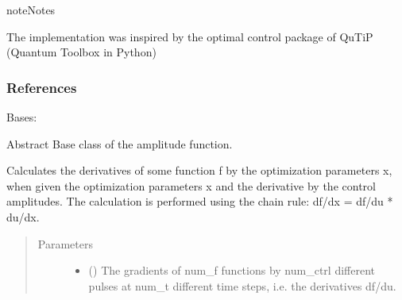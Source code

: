 \documentclass[letterpaper,10pt,english]{sphinxmanual}
\begin{document}
\begin{sphinxadmonition}{note}{Notes}

The implementation was inspired by the optimal control package of QuTiP 
(Quantum Toolbox in Python)
\end{sphinxadmonition}
\subsubsection*{References}

\begin{fulllineitems}
\label{\detokenize{qsim:qsim.amplitude_functions.AmplitudeFunction}}
Bases: 

Abstract Base class of the amplitude function.

\begin{fulllineitems}
\label{\detokenize{qsim:qsim.amplitude_functions.AmplitudeFunction.derivative_by_chain_rule}}
Calculates the derivatives of some function f by the optimization
parameters x, when given the optimization parameters x and the
derivative by the control amplitudes. The calculation is performed
using the chain rule: df/dx = df/du * du/dx.
\begin{quote}\begin{description}
\item[{Parameters}] \leavevmode\begin{itemize}
\item {} 
 (\sphinxstyleliteralemphasis{\sphinxupquote{, }}\sphinxstyleliteralemphasis{\sphinxupquote{ (}}\sphinxstyleliteralemphasis{\sphinxupquote{, }}\sphinxstyleliteralemphasis{\sphinxupquote{, }}\sphinxstyleliteralemphasis{\sphinxupquote{)}}) \textendash{} The gradients of num\_f functions by num\_ctrl different pulses at
num\_t different time steps, i.e. the derivatives df/du.


\end{itemize}
\end{description}
\end{quote}
\end{fulllineitems}
\end{fulllineitems}
\end{document}
